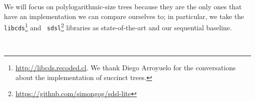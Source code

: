 We will focus on polylogarithmic-size trees because they are the only
ones that have an implementation we can compare ourselves to; in
particular, we take the {\tt
libcds}\footnote{\url{http://libcds.recoded.cl}. We thank Diego
Arroyuelo for the conversations about the implementation of succinct
trees.}\cite{ACNSalenex10} and {\tt
sdsl}\footnote{\url{https://github.com/simongog/sdsl-lite}} libraries
as state-of-the-art and our sequential baseline.

\\
